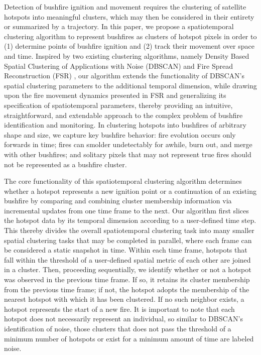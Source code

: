 Detection of bushfire ignition and movement requires the clustering of
satellite hotspots into meaningful clusters, which may then be
considered in their entirety or summarized by a trajectory. In this
paper, we propose a spatiotemporal clustering algorithm to represent
bushfires as clusters of hotspot pixels in order to (1) determine points
of bushfire ignition and (2) track their movement over space and time.
Inspired by two existing clustering algorithms, namely Density Based
Spatial Clustering of Applications with Noise (DBSCAN)
\citep{ester1996density} and Fire Spread Reconstruction (FSR)
\citep{Loboda2007}, our algorithm extends the functionality of DBSCAN's
spatial clustering parameters to the additional temporal dimension,
while drawing upon the fire movement dynamics presented in FSR and
generalizing its specification of spatiotemporal parameters, thereby
providing an intuitive, straightforward, and extendable approach to the
complex problem of bushfire identification and monitoring. In clustering
hotspots into bushfires of arbitrary shape and size, we capture key
bushfire behavior: fire evolution occurs only forwards in time; fires
can smolder undetectably for awhile, burn out, and merge with other
bushfires; and solitary pixels that may not represent true fires should
not be represented as a bushfire cluster.

The core functionality of this spatiotemporal clustering algorithm
determines whether a hotspot represents a new ignition point or a
continuation of an existing bushfire by comparing and combining cluster
membership information via incremental updates from one time frame to
the next. Our algorithm first slices the hotspot data by its temporal
dimension according to a user-defined time step. This thereby divides
the overall spatiotemporal clustering task into many smaller spatial
clustering tasks that may be completed in parallel, where each frame can
be considered a static snapshot in time. Within each time frame,
hotspots that fall within the threshold of a user-defined spatial metric
of each other are joined in a cluster. Then, proceeding sequentially, we
identify whether or not a hotspot was observed in the previous time
frame. If so, it retains its cluster membership from the previous time
frame; if not, the hotspot adopts the membership of the nearest hotspot
with which it has been clustered. If no such neighbor exists, a hotspot
represents the start of a new fire. It is important to note that each
hotspot does not necessarily represent an individual, so similar to
DBSCAN's identification of noise, those clusters that does not pass the
threshold of a minimum number of hotspots or exist for a minimum amount
of time are labeled noise.

